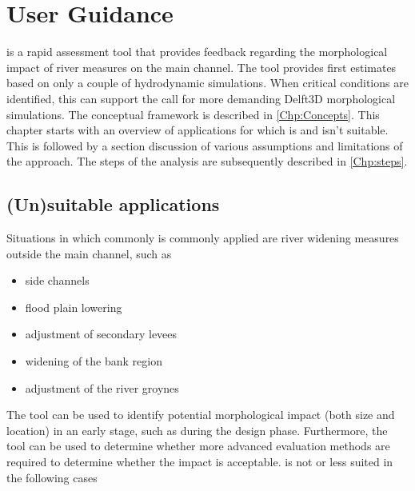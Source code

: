\chapter{User Guidance}\label{Chp:Guidance}

\dfastmi is a rapid assessment tool that provides feedback regarding the morphological impact of river measures on the main channel.
The tool provides first estimates based on only a couple of hydrodynamic simulations.
When critical conditions are identified, this can support the call for more demanding Delft3D morphological simulations.
The conceptual framework is described in \autoref{Chp:Concepts}.
This chapter starts with an overview of applications for which \dfmi is and isn't suitable.
This is followed by a section discussion of various assumptions and limitations of the \dfmi approach.
The steps of the analysis are subsequently described in \autoref{Chp:steps}.

\section{(Un)suitable applications}\label{Sec:SuitableApplications}

Situations in which commonly \dfmi is commonly applied are river widening measures outside the main channel, such as

\begin{itemize}
\item side channels
\item flood plain lowering
\item adjustment of secondary levees
\item widening of the bank region
\item adjustment of the river groynes
\end{itemize}

The tool can be used to identify potential morphological impact (both size and location) in an early stage, such as during the design phase.
Furthermore, the tool can be used to determine whether more advanced evaluation methods are required to determine whether the impact is acceptable.
\dfmi is not or less suited in the following cases

